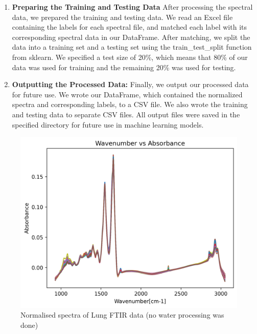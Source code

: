\documentclass{cernatsnote}
\begin{document}
\begin{enumerate}
\item \textbf{Preparing the Training and Testing Data}
After processing the spectral data, we prepared the training and testing data. We read an Excel file containing the labels for each spectral file, and matched each label with its corresponding spectral data in our DataFrame. After matching, we split the data into a training set and a testing set using the train\_test\_split function from sklearn. We specified a test size of 20\%, which means that 80\% of our data was used for training and the remaining 20\% was used for testing. 

\item \textbf{Outputting the Processed Data:}
Finally, we output our processed data for future use. We wrote our DataFrame, which contained the normalized spectra and corresponding labels, to a CSV file. We also wrote the training and testing data to separate CSV files. All output files were saved in the specified directory for future use in machine learning models.

\end{enumerate}

\begin{figure}[h!]
    \centering
    \includegraphics[width=0.9\linewidth]{images/Lung_FTIR.png}
    \caption{Normalised spectra of Lung FTIR data (no water processing was done)}
    \label{FTIR_Spectra}
\end{figure}
\end{document}
